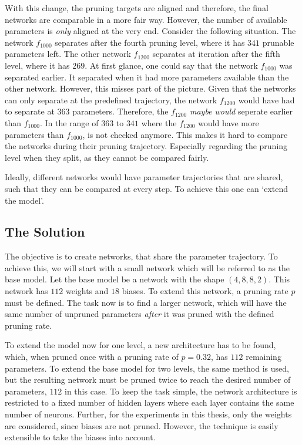 With this change, the pruning targets are aligned and therefore, the final networks are comparable in a more fair way.
However, the number of available parameters is \textit{only} aligned at the very end.
Consider the following situation.
The network $f_{1000}$ separates after the fourth pruning level, where it has $341$ prunable parameters left. 
The other network $f_{1200}$ separates at iteration after the fifth level, where it has $269$.
At first glance, one could say that the network $f_{1000}$ was separated earlier.
It separated when it had more parameters available than the other network.
However, this misses part of the picture.
Given that the networks can only separate at the predefined trajectory, the network $f_{1200}$ would have had to separate at $363$ parameters.
Therefore, the $f_{1200}$ \textit{maybe would} seperate earlier than $f_{1000}$.
In the range of $363$ to $341$ where the $f_{1200}$ would have more parameters than $f_{1000}$, is not checked anymore.
This makes it hard to compare the networks during their pruning trajectory.
Especially regarding the pruning level when they split, as they cannot be compared fairly.

Ideally, different networks would have parameter trajectories that are shared, such that they can be compared at every step.
To achieve this one can `extend the model'.

\subsection{The Solution}
The objective is to create networks, that share the parameter trajectory.
To achieve this, we will start with a small network which will be referred to as the base model.
Let the base model be a network with the shape $(4, 8, 8, 2)$.
This network has $112$ weights and $18$ biases.
To extend this network, a pruning rate $p$ must be defined.
The task now is to find a larger network, which will have the same number of unpruned parameters \textit{after} it was pruned with the defined pruning rate.

To extend the model now for one level, a new architecture has to be found, which, when pruned once with a pruning rate of $p=0.32$, has $112$ remaining parameters.
To extend the base model for two levels, the same method is used, but the resulting network must be pruned twice to reach the desired number of parameters, $112$ in this case.
To keep the task simple, the network architecture is restricted to a fixed number of hidden layers where each layer contains the same number of neurons.
Further, for the experiments in this thesis, only the weights are considered, since biases are not pruned.
However, the technique is easily extensible to take the biases into account.

